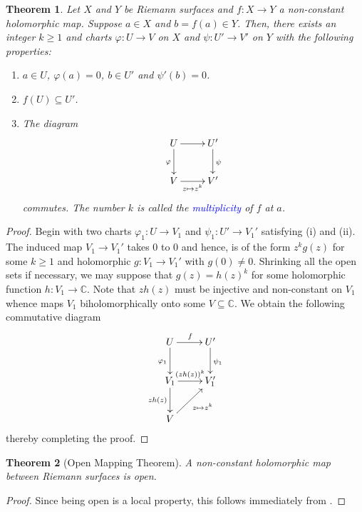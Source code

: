 \documentclass[12pt]{article}
\theoremstyle{thmstyle}
\newtheorem{theorem}{Theorem}[section]
\theoremstyle{defstyle}
\newcommand{\bbC}{\mathbb{C}}
\newcommand{\define}[1]{\textcolor{blue}{\textit{#1}}}
\renewcommand{\ge}{\geqslant}
\begin{document}
\begin{theorem}
    Let $X$ and $Y$ be Riemann surfaces and $f: X\to Y$ a non-constant holomorphic map. Suppose $a\in X$ and $b = f(a)\in Y$. Then, there exists an integer $k\ge 1$ and charts $\varphi: U\to V$ on $X$ and $\psi: U'\to V'$ on $Y$ with the following properties: 
    \begin{enumerate}[label=(\roman*)]
        \item $a\in U$, $\varphi(a) = 0$, $b\in U'$ and $\psi'(b) = 0$.
        \item $f(U)\subseteq U'$.
        \item The diagram
        \begin{equation*}
            \xymatrix {
                U\ar[r]\ar[d]_{\varphi} & U'\ar[d]^\psi\\
                V\ar[r]_-{z\mapsto z^k} & V'
            }
        \end{equation*}
        commutes. The number $k$ is called the \define{multiplicity} of $f$ at $a$.
    \end{enumerate}
\end{theorem}
\begin{proof}
    Begin with two charts $\varphi_1: U\to V_1$ and $\psi_1: U'\to V_1'$ satisfying (i) and (ii). The induced map $V_1\to V_1'$ takes $0$ to $0$ and hence, is of the form $z^kg(z)$ for some $k\ge 1$ and holomorphic $g: V_1\to V_1'$ with $g(0)\ne 0$. Shrinking all the open sets if necessary, we may suppose that $g(z) = h(z)^k$ for some holomorphic function $h: V_1\to\bbC$. Note that $zh(z)$ must be injective and non-constant on $V_1$ whence maps $V_1$ biholomorphically onto some $V\subseteq\bbC$. We obtain the following commutative diagram 
    \begin{equation*}
    \xymatrix{
        U\ar[r]^f\ar[d]_{\varphi_1} & U'\ar[d]^{\psi_1}\\
        V_1\ar[r]^{(zh(z))^k}\ar[d]_{zh(z)} & V_1'\\
        V\ar[ru]_{z\mapsto z^k}
    }
    \end{equation*}
    thereby completing the proof.
\end{proof}

\begin{theorem}[Open Mapping Theorem]
    A non-constant holomorphic map between Riemann surfaces is open.
\end{theorem}
\begin{proof}
    Since being open is a local property, this follows immediately from .
\end{proof}
\end{document}
